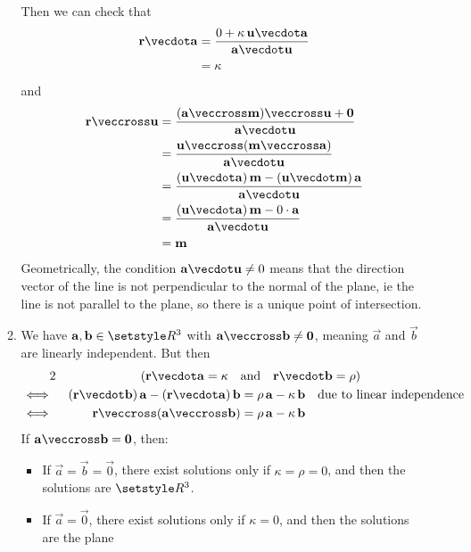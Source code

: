 \documentclass[fleqn,a4paper,11pt]{article}
\begin{document}
\begin{enumerate}[label=\textbf{\arabic*.}]
\begin{enumerate}[label=(\alph*)]
     Then we can check that
     \begin{align*}
      \vec r \vecdot \vec a
       &= \frac{0 + \kappa\,\vec u \vecdot \vec a}
               {\vec a \vecdot \vec u} \\
       &= \kappa
     \end{align*}
     and
     \begin{align*}
      \vec r \veccross \vec u
       &= \frac{(\vec a \veccross \vec m) \veccross \vec u + \vec 0}
               {\vec a \vecdot \vec u} \\
       &= \frac{\vec u \veccross (\vec m \veccross \vec a)}
               {\vec a \vecdot \vec u} \\
       &= \frac{(\vec u \vecdot \vec a)\,\vec m - (\vec u \vecdot \vec m)\,\vec a}
               {\vec a \vecdot \vec u} \\
       &= \frac{(\vec u \vecdot \vec a)\,\vec m - 0 \cdot \vec a}
               {\vec a \vecdot \vec u} \\
       &= \vec m
     \end{align*}
     Geometrically, the condition \(\vec a \vecdot \vec u \ne 0\) means that the
     direction vector of the line is not perpendicular to the normal of the
     plane, ie the line is not parallel to the plane, so there is a unique point
     of intersection.
    \item
     We have \(\vec a, \vec b \in  \Reals^3\) with
     \(\vec a \veccross \vec b \ne \vec 0\), meaning \(\vec a\) and \(\vec b\)
     are linearly independent. But then
     \begin{alignat*}2
      && (\vec r \vecdot \vec a = \kappa \quad &\text{and} \quad
          \vec r \vecdot \vec b = \rho) \\
      \iff{}&& (\vec r \vecdot \vec b)\,\vec a - (\vec r \vecdot \vec a)\,\vec b
       &= \rho\,\vec a - \kappa\,\vec b
       \quad \text{due to linear independence} \\
      \iff{}&& \vec r \veccross (\vec a \veccross \vec b)
       &= \rho\,\vec a - \kappa\,\vec b
     \end{alignat*}
     If \(\vec a \veccross \vec b = \vec 0\), then:
     \begin{itemize}
      \item
       If \(\vec a = \vec b = \vec 0\), there exist solutions only if
       \(\kappa = \rho = 0\), and then the solutions are \(\Reals^3\).
      \item
       If \(\vec a = \vec 0\), there exist solutions only if
       \(\kappa = 0\), and then the solutions are the plane

\end{itemize}
\end{enumerate}
\end{enumerate}
\end{document}
